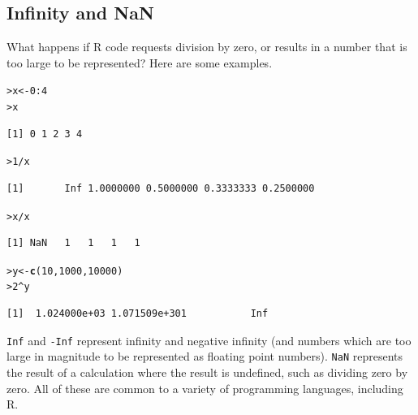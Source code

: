 \documentclass[12pt,oneside]{book}\usepackage[]{graphicx}\usepackage[]{color}
\makeatletter
\newcommand{\hlnum}[1]{\textcolor[rgb]{0.686,0.059,0.569}{#1}}%
\newcommand{\hlopt}[1]{\textcolor[rgb]{0,0,0}{#1}}%
\newcommand{\hlstd}[1]{\textcolor[rgb]{0.345,0.345,0.345}{#1}}%
\newcommand{\hlkwb}[1]{\textcolor[rgb]{0.69,0.353,0.396}{#1}}%
\newcommand{\hlkwd}[1]{\textcolor[rgb]{0.737,0.353,0.396}{\textbf{#1}}}%
\newenvironment{kframe}{%
 \def\at@end@of@kframe{}%
 \ifinner\ifhmode%
  \def\at@end@of@kframe{\end{minipage}}%
  \begin{minipage}{\columnwidth}%
 \fi\fi%
 \def\FrameCommand##1{\hskip\@totalleftmargin \hskip-\fboxsep
 \colorbox{shadecolor}{##1}\hskip-\fboxsep
     \hskip-\linewidth \hskip-\@totalleftmargin \hskip\columnwidth}%
 \MakeFramed {\advance\hsize-\width
   \@totalleftmargin\z@ \linewidth\hsize
   \@setminipage}}%
 {\par\unskip\endMakeFramed%
 \at@end@of@kframe}
\newenvironment{knitrout}{}{} %
\makeatother
\begin{document}
\subsection{Infinity and NaN}
What happens if R code requests division by zero, or results in a number that is too large to be represented? Here are some examples.
\begin{knitrout}
\color{fgcolor}\begin{kframe}
\begin{alltt}
\hlstd{> }\hlstd{x} \hlkwb{<-} \hlnum{0}\hlopt{:}\hlnum{4}
\hlstd{> }\hlstd{x}
\end{alltt}
\begin{verbatim}
[1] 0 1 2 3 4
\end{verbatim}
\begin{alltt}
\hlstd{> }\hlnum{1}\hlopt{/}\hlstd{x}
\end{alltt}
\begin{verbatim}
[1]       Inf 1.0000000 0.5000000 0.3333333 0.2500000
\end{verbatim}
\begin{alltt}
\hlstd{> }\hlstd{x}\hlopt{/}\hlstd{x}
\end{alltt}
\begin{verbatim}
[1] NaN   1   1   1   1
\end{verbatim}
\begin{alltt}
\hlstd{> }\hlstd{y} \hlkwb{<-} \hlkwd{c}\hlstd{(}\hlnum{10}\hlstd{,} \hlnum{1000}\hlstd{,} \hlnum{10000}\hlstd{)}
\hlstd{> }\hlnum{2}\hlopt{^}\hlstd{y}
\end{alltt}
\begin{verbatim}
[1]  1.024000e+03 1.071509e+301           Inf
\end{verbatim}
\end{kframe}
\end{knitrout}
\verb+Inf+ and \verb+-Inf+ represent infinity and negative infinity (and numbers which are too large in magnitude to be represented as floating point numbers). \verb+NaN+ represents the result of a calculation where the result is undefined, such as dividing zero by zero. All of these are common to a variety of programming languages, including R. 
\end{document}
